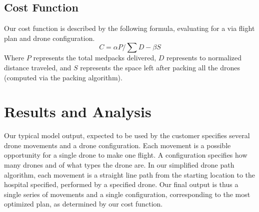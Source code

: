 \documentclass[twocolumn,10pt]{asme2ej}
\begin{document}
\subsection{Cost Function}
Our cost function is described by the following formula, evaluating for a via flight plan and drone configuration.
\[
C = \alpha P / \sum{D} - \beta S
\]
Where $P$ represents the total medpacks delivered, $D$ represents to normalized distance traveled, and $S$ represents the space left after packing all the drones (computed via the packing algorithm). 


\section{Results and Analysis}
Our typical model output, expected to be used by the customer specifies several drone movements and a drone configuration. Each movement is a possible opportunity for a single drone to make one flight. A configuration specifies how many drones and of what types the drone are. In our simplified drone path algorithm, each movement is a straight line path from the starting location to the hospital specified, performed by a specified drone. Our final output is thus a single series of movements and a single configuration, corresponding to the most optimized plan, as determined by our cost function. 
\end{document}
